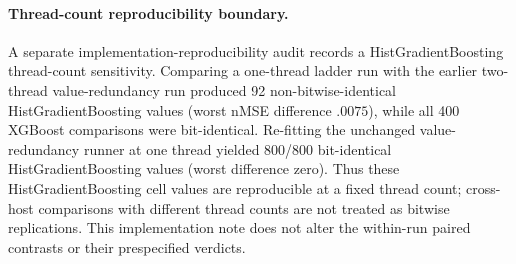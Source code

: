 
\paragraph{Thread-count reproducibility boundary.}
A separate implementation-reproducibility audit records a
HistGradientBoosting thread-count sensitivity.  Comparing a one-thread ladder
run with the earlier two-thread value-redundancy run produced 92
non-bitwise-identical HistGradientBoosting values (worst nMSE difference
$.0075$), while all 400 XGBoost comparisons were bit-identical.  Re-fitting
the unchanged value-redundancy runner at one thread yielded 800/800
bit-identical HistGradientBoosting values (worst difference zero).  Thus these
HistGradientBoosting cell values are reproducible at a fixed thread count;
cross-host comparisons with different thread counts are not treated as
bitwise replications.  This implementation note does not alter the within-run
paired contrasts or their prespecified verdicts.
\FloatBarrier


